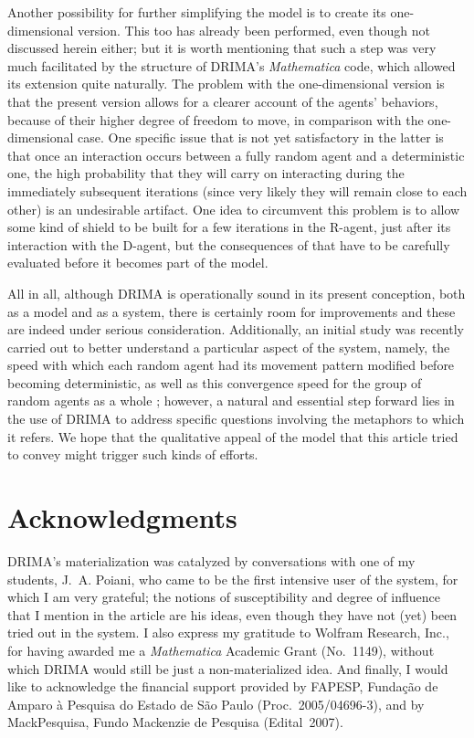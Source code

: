 \documentclass[11pt, a4paper]{article}
\begin{document}
Another possibility for further simplifying the model is to create its one-dimensional version. This too has already been performed, even though not discussed herein either; but it is worth mentioning that such a step was very much facilitated by the structure of DRIMA's \textit{Mathematica} code, which allowed its extension quite naturally. The problem with the one-dimensional version is that the present version allows for a clearer account of the agents' behaviors, because of their higher degree of freedom to move, in comparison with the one-dimensional case. One specific issue that is not yet satisfactory in the latter is that once an interaction occurs between a fully random agent and a deterministic one, the high probability that they will carry on interacting during the immediately subsequent iterations (since very likely they will remain close to each other) is an undesirable artifact. One idea to circumvent this problem is to allow some kind of shield to be built for a few iterations in the R-agent, just after its interaction with the D-agent, but the consequences of that have to be carefully evaluated before it becomes part of the model.

All in all, although DRIMA is operationally sound in its present conception, both as a model and as a system, there is certainly room for improvements and these are indeed under serious consideration. Additionally, an initial study was recently carried out to better understand a particular aspect of the system, namely, the speed with which each random agent had its movement pattern modified before becoming deterministic, as well as this convergence speed for the group of random agents as a whole \cite{ref6}; however, a natural and essential step forward lies in the use of DRIMA to address specific questions involving the metaphors to which it refers. We hope that the qualitative appeal of the model that this article tried to convey might trigger such kinds of efforts.

\section*{Acknowledgments}

DRIMA's materialization was catalyzed by conversations with one of my students, J.~A. Poiani, who came to be the first intensive user of the system, for which I am very grateful; the notions of susceptibility and degree of influence that I mention in the article are his ideas, even though they have not (yet) been tried out in the system. I also express my gratitude to Wolfram Research, Inc., for having awarded me a \textit{Mathematica} Academic Grant (No.~1149), without which DRIMA would still be just a non-materialized idea. And finally, I would like to acknowledge the financial support provided by FAPESP, Funda\c{c}\~ao de Amparo \`a Pesquisa do Estado de S\~ao Paulo (Proc.~2005/04696-3), and by MackPesquisa, Fundo Mackenzie de Pesquisa (Edital~2007).
\end{document}
